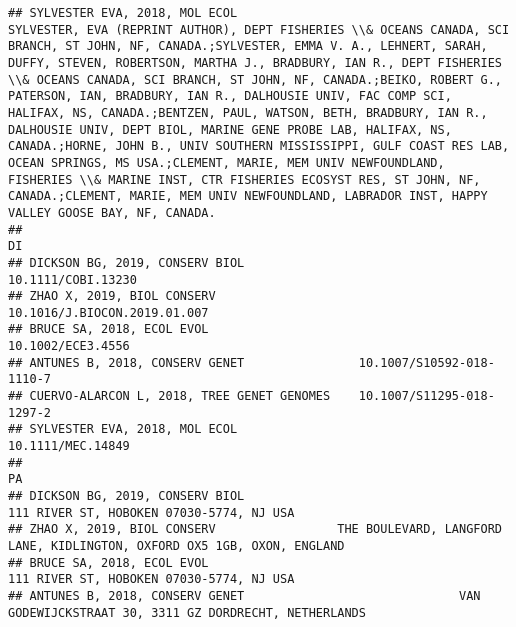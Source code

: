 \documentclass[]{article}
\begin{document}
\begin{verbatim}
## SYLVESTER EVA, 2018, MOL ECOL                                                                                                                                                                                                                                                                                                                                                                                                                                                                                                                                                                                                                                                                         SYLVESTER, EVA (REPRINT AUTHOR), DEPT FISHERIES \\& OCEANS CANADA, SCI BRANCH, ST JOHN, NF, CANADA.;SYLVESTER, EMMA V. A., LEHNERT, SARAH, DUFFY, STEVEN, ROBERTSON, MARTHA J., BRADBURY, IAN R., DEPT FISHERIES \\& OCEANS CANADA, SCI BRANCH, ST JOHN, NF, CANADA.;BEIKO, ROBERT G., PATERSON, IAN, BRADBURY, IAN R., DALHOUSIE UNIV, FAC COMP SCI, HALIFAX, NS, CANADA.;BENTZEN, PAUL, WATSON, BETH, BRADBURY, IAN R., DALHOUSIE UNIV, DEPT BIOL, MARINE GENE PROBE LAB, HALIFAX, NS, CANADA.;HORNE, JOHN B., UNIV SOUTHERN MISSISSIPPI, GULF COAST RES LAB, OCEAN SPRINGS, MS USA.;CLEMENT, MARIE, MEM UNIV NEWFOUNDLAND, FISHERIES \\& MARINE INST, CTR FISHERIES ECOSYST RES, ST JOHN, NF, CANADA.;CLEMENT, MARIE, MEM UNIV NEWFOUNDLAND, LABRADOR INST, HAPPY VALLEY GOOSE BAY, NF, CANADA.
##                                                                      DI
## DICKSON BG, 2019, CONSERV BIOL                       10.1111/COBI.13230
## ZHAO X, 2019, BIOL CONSERV                 10.1016/J.BIOCON.2019.01.007
## BRUCE SA, 2018, ECOL EVOL                             10.1002/ECE3.4556
## ANTUNES B, 2018, CONSERV GENET                10.1007/S10592-018-1110-7
## CUERVO-ALARCON L, 2018, TREE GENET GENOMES    10.1007/S11295-018-1297-2
## SYLVESTER EVA, 2018, MOL ECOL                         10.1111/MEC.14849
##                                                                                                                 PA
## DICKSON BG, 2019, CONSERV BIOL                                            111 RIVER ST, HOBOKEN 07030-5774, NJ USA
## ZHAO X, 2019, BIOL CONSERV                 THE BOULEVARD, LANGFORD LANE, KIDLINGTON, OXFORD OX5 1GB, OXON, ENGLAND
## BRUCE SA, 2018, ECOL EVOL                                                 111 RIVER ST, HOBOKEN 07030-5774, NJ USA
## ANTUNES B, 2018, CONSERV GENET                              VAN GODEWIJCKSTRAAT 30, 3311 GZ DORDRECHT, NETHERLANDS

\end{verbatim}
\end{document}
